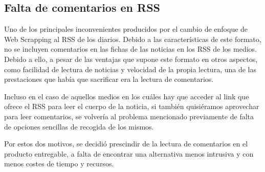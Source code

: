 \subsection{Falta de comentarios en RSS}

Uno de los principales inconvenientes producidos por el cambio de enfoque de Web Scrapping al RSS de los diarios. Debido a las características de este formato, no se incluyen comentarios en las fichas de las noticias en los RSS de los medios. Debido a ello, a pesar de las ventajas que supone este formato en otros aspectos, como facilidad de lectura de noticias y velocidad de la propia lectura, una de las prestaciones que había que sacrificar era la lectura de comentarios.

Incluso en el caso de aquellos medios en los cuáles hay que acceder al link que ofrece el RSS para leer el cuerpo de la noticia, si también quisiéramos aprovechar para leer comentarios, se volvería al problema mencionado previamente de falta de opciones sencillas de recogida de los mismos.


Por estos dos motivos, se decidió prescindir de la lectura de comentarios en el producto entregable, a falta de encontrar una alternativa menos intrusiva y con menos costes de tiempo y recursos.